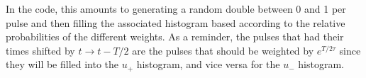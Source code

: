 In the code, this amounts to generating a random double between 0 and 1 per pulse and then filling the associated histogram based according to the relative probabilities of the different weights.
 As a reminder, the pulses that had their times shifted by $t \rightarrow t - T/2$ are the pulses that should be weighted by $e^{T/2\tau}$ since they will be filled into the $u_{+}$ histogram, and vice versa for the $u_{-}$ histogram.
